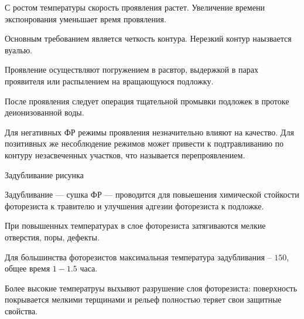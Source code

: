 \documentclass{article}
\begin{document}
С ростом температуры скорость проявления растет. Увеличение времени экспонрования уменьшает время провяления.

Основным требованием является четкость контура. Нерезкий контур наызвается вуалью.

Проявление осуществляют погружением в расвтор, выдержкой в парах проявителя или распылением на вращающуюся подложку.

После проявления следует операция тщательной промывки подложек в протоке деионизованной воды.

Для негативных ФР режимы проявления незначительно влияют на качество. Для позитивных же несоблюдение режимов может привести к подтравливанию по контуру незасвеченных участков, что называется перепроявлением.

Задубливание рисунка

Задубливание --- сушка ФР --- проводится для повыешения химической стойкости фоторезиста к травителю и улучшения адгезии фоторезиста к подложке.

При повышенных температурах в слое фоторезиста затягиваются мелкие отверстия, поры, дефекты.

Для большинства фоторезистов максимальная температура задубливания -- $150$, общее время $1-1.5$ часа.

Более высокие температруы выхывют разрушение слоя фоторезиста: поверхность покрывается мелкими терщинами и рельеф полностью теряет свои защитные свойства.
\end{document}
